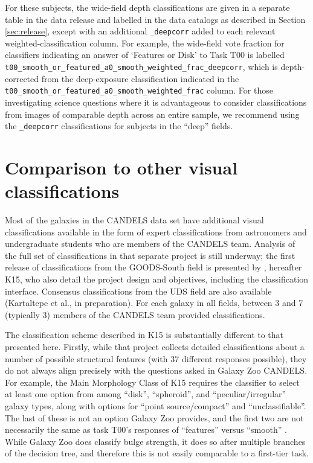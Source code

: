 \documentclass[useAMS,usenatbib]{mn2e}
\def\notebsm	{\color{titlecol}}
\begin{document}
{For these subjects, the wide-field depth classifications are given in a separate table in the data release and labelled in the data catalogs as described in Section \ref{sec:release}, except with an additional {\small \tt \_deepcorr} added to each relevant weighted-classification column. For example, the wide-field vote fraction for classifiers indicating an answer of `Features or Disk' to Task T00 is labelled {\small \tt t00\_smooth\_or\_featured\_a0\_smooth\_weighted\_frac\_deepcorr}, which is depth-corrected from the deep-exposure classification indicated in the {\small \tt t00\_smooth\_or\_featured\_a0\_smooth\_weighted\_frac} column. For those investigating science questions where it is advantageous to consider classifications from images of comparable depth across an entire sample, we recommend using the {\small \tt \_deepcorr} classifications for subjects in the ``deep'' fields.



%
%  
\section{Comparison to other visual classifications}\label{sec:comparison}
%
%

Most of the galaxies in the CANDELS data set have additional visual classifications available in the form of expert classifications from astronomers and undergraduate students who are members of the CANDELS team. Analysis of the full set of classifications in that separate project is still underway; the first release of classifications from the GOODS-South field is presented by \citet{kartaltepe15}, hereafter K15, who also detail the project design and objectives, including the classification interface. Consensus classifications from the UDS field are also available {\notebsm (Kartaltepe et al., in preparation)}. For each galaxy in all fields, between 3 and 7 (typically 3) members of the CANDELS team provided classifications.

The classification scheme described in K15 is substantially different to that presented here. Firstly, while that project collects detailed classifications about a number of possible structural features (with 37 different responses possible), they do not always align precisely with the questions asked in Galaxy Zoo CANDELS. For example, the Main Morphology Class of K15 requires the classifier to select at least one option from among ``disk'', ``spheroid'', and ``peculiar/irregular'' galaxy types, along with options for ``point source/compact'' and ``unclassifiable''. The last of these is not an option Galaxy Zoo provides, and the first two are not necessarily the same as task T00's responses of ``features'' versus ``smooth'' \citep[note: this also means we cannot compare to the machine classifications of][as there are no categories in that study that translate to the measurements made by Galaxy Zoo volunteers]{huertascompany15}. While Galaxy Zoo does classify bulge strength, it does so after multiple branches of the decision tree, and therefore this is not easily comparable to a first-tier task.

}
\end{document}
